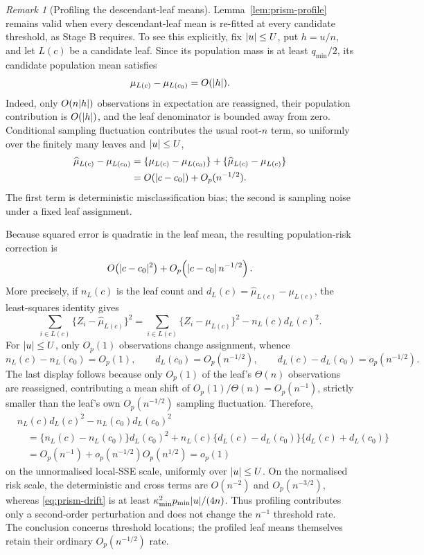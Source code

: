 \documentclass[11pt]{article}
\theoremstyle{plain}
\theoremstyle{definition}
\theoremstyle{remark}
\newtheorem{remark}[theorem]{Remark}
\DeclarePairedDelimiter{\abs}{\lvert}{\rvert}
\begin{document}
\begin{remark}[Profiling the descendant-leaf means]
\label{rem:profiling-correction}
Lemma~\ref{lem:prism-profile} remains valid when every descendant-leaf mean is
re-fitted at every candidate threshold, as Stage B requires.  To see this
explicitly, fix \(\abs u\le U\), put \(h=u/n\), and let \(L(c)\) be a candidate
leaf.  Since its population mass is at least \(q_{\min}/2\), its candidate
population mean satisfies
\[
  \mu_{L(c)}-\mu_{L(c_0)}
  =
  O(\abs h).
\]
Indeed, only \(O(n\abs h)\) observations in expectation are reassigned, their
population contribution is \(O(\abs h)\), and the leaf denominator is bounded
away from zero.  Conditional sampling fluctuation contributes the usual
root-\(n\) term, so uniformly over the finitely many leaves and
\(\abs u\le U\),
\begin{align*}
  \widehat\mu_{L(c)}-\mu_{L(c_0)}
  &=
  \{\mu_{L(c)}-\mu_{L(c_0)}\}
  +\{\widehat\mu_{L(c)}-\mu_{L(c)}\}
  \\
  &=
  O(\abs{c-c_0})+O_p(n^{-1/2}).
\end{align*}
The first term is deterministic misclassification bias; the second is
sampling noise under a fixed leaf assignment.

Because squared error is quadratic in the leaf mean, the resulting
population-risk correction is
\[
  O\!\left(\abs{c-c_0}^2\right)
  +
  O_p\!\left(\abs{c-c_0}\,n^{-1/2}\right).
\]
More precisely, if \(n_L(c)\) is the leaf count and
\(d_L(c)=\widehat\mu_{L(c)}-\mu_{L(c)}\), the least-squares identity gives
\[
  \sum_{i\in L(c)}\{Z_i-\widehat\mu_{L(c)}\}^2
  =
  \sum_{i\in L(c)}\{Z_i-\mu_{L(c)}\}^2
  -
  n_L(c)d_L(c)^2.
\]
For \(\abs u\le U\), only \(O_p(1)\) observations change assignment, whence
\[
  n_L(c)-n_L(c_0)=O_p(1),
  \qquad
  d_L(c_0)=O_p(n^{-1/2}),
  \qquad
  d_L(c)-d_L(c_0)=o_p(n^{-1/2}).
\]
The last display follows because only \(O_p(1)\) of the leaf's \(\Theta(n)\)
observations are reassigned, contributing a mean shift of
\(O_p(1)/\Theta(n)=O_p(n^{-1})\), strictly smaller than the leaf's own
\(O_p(n^{-1/2})\) sampling fluctuation.
Therefore,
\begin{align*}
  &n_L(c)d_L(c)^2-n_L(c_0)d_L(c_0)^2
  \\
  &\quad=
  \{n_L(c)-n_L(c_0)\}d_L(c_0)^2
  +n_L(c)\{d_L(c)-d_L(c_0)\}
       \{d_L(c)+d_L(c_0)\}
  \\
  &\quad=
  O_p(n^{-1})+o_p(n^{-1/2})O_p(n^{1/2})
  =
  o_p(1)
\end{align*}
on the unnormalised local-SSE scale, uniformly over \(\abs u\le U\).
On the normalised risk scale, the deterministic and cross terms are
\(O(n^{-2})\) and \(O_p(n^{-3/2})\), whereas
\eqref{eq:prism-drift} is at least
\(\kappa_{\min}^2p_{\min}\abs u/(4n)\).  Thus profiling contributes only a
second-order perturbation and does not change the \(n^{-1}\) threshold rate.
The conclusion concerns threshold locations; the profiled leaf means
themselves retain their ordinary \(O_p(n^{-1/2})\) rate.
\end{remark}
\end{document}
